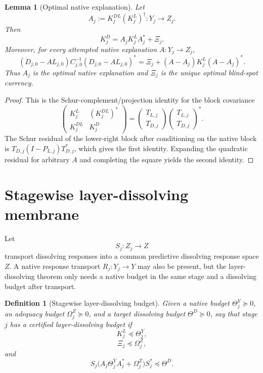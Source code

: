 \documentclass[11pt]{article}
\newtheorem{lemma}{Lemma}
\newtheorem{definition}{Definition}
\begin{document}
\begin{lemma}[Optimal native explanation]
Let
\[
 A_j:=K^{DL}_j(K^L_j)^\dagger:Y_j\to Z_j.
\]
Then
\[
 K^D_j=A_jK^L_jA_j^*+\Xi_j.
\]
Moreover, for every attempted native explanation $A:Y_j\to Z_j$,
\[
 (D_{j,0}-AL_{j,0})C_{j,0}^{-1}(D_{j,0}-AL_{j,0})^*
 =\Xi_j+(A-A_j)K^L_j(A-A_j)^*.
\]
Thus $A_j$ is the optimal native explanation and $\Xi_j$ is the unique optimal blind-spot currency.
\end{lemma}

\begin{proof}
This is the Schur-complement/projection identity for the block covariance
\[
\begin{pmatrix}
K^L_j & (K^{DL}_j)^*\\
K^{DL}_j & K^D_j
\end{pmatrix}
=\begin{pmatrix}T_{L,j}\\T_{D,j}\end{pmatrix}
\begin{pmatrix}T_{L,j}\\T_{D,j}\end{pmatrix}^*.
\]
The Schur residual of the lower-right block after conditioning on the native block is
$T_{D,j}(I-P_{L,j})T_{D,j}^*$, which gives the first identity.  Expanding the quadratic residual for arbitrary $A$ and completing the square yields the second identity.
\end{proof}

\section{Stagewise layer-dissolving membrane}
Let
\[
 S_j:Z_j\to Z
\]
transport dissolving responses into a common predictive dissolving response space $Z$.  A native response transport $R_j:Y_j\to Y$ may also be present, but the layer-dissolving theorem only needs a native budget in the same stage and a dissolving budget after transport.

\begin{definition}[Stagewise layer-dissolving budget]
Given a native budget $\Theta^Y_j\succeq0$, an adequacy budget $\Omega^Z_j\succeq0$, and a target dissolving budget $\Theta^D\succeq0$, say that stage $j$ has a certified layer-dissolving budget if
\[
 K^L_j\preceq \Theta^Y_j,
\]
\[
 \Xi_j\preceq \Omega^Z_j,
\]
and
\[
 S_j\bigl(A_j\Theta^Y_jA_j^*+\Omega^Z_j\bigr)S_j^*
 \preceq \Theta^D.
\]
\end{definition}
\end{document}
